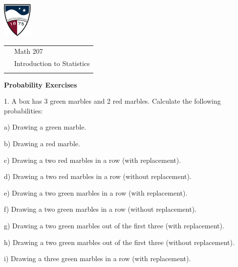 \documentclass[10pt]{article}
\begin{document}
\pagestyle{empty}
\lstset{language=R, showspaces=false, showstringspaces=false}

\href{http://www.su.edu}{\includegraphics[height=1.75cm]{sulogo.eps}}
\vspace{-1.69cm}

{\small
\begin{tabular}{cl}
& Math 207\\
& Introduction to Statistics\\
\hspace{5.28in} & %
\end{tabular}
}
\setlength{\baselineskip}{1.05\baselineskip}

\begin{center}
\textbf{\large  Probability Exercises}
\end{center}
\medskip
\newcommand{\Z}{\hphantom{0}}

1. A box has 3 green marbles and 2 red marbles.  Calculate the following probabilities:

\hspace{20pt} a)  Drawing a green marble.
\bigskip

\hspace{20pt} b)  Drawing a red marble.
\bigskip

\hspace{20pt} c) Drawing a two red marbles in a row (with replacement).
\bigskip

\hspace{20pt} d) Drawing a two red marbles in a row (without replacement).
\bigskip

\hspace{20pt} e) Drawing a two green marbles in a row (with replacement).
\bigskip

\hspace{20pt} f) Drawing a two green marbles in a row (without replacement).
\bigskip

\hspace{20pt} g) Drawing a two green marbles out
  of the first three (with replacement).
\bigskip

\hspace{20pt} h) Drawing a two green marbles out
  of the first three (without replacement).
\bigskip

\hspace{20pt} i) Drawing a three green marbles in a row
  (with replacement).
\bigskip
\end{document}
